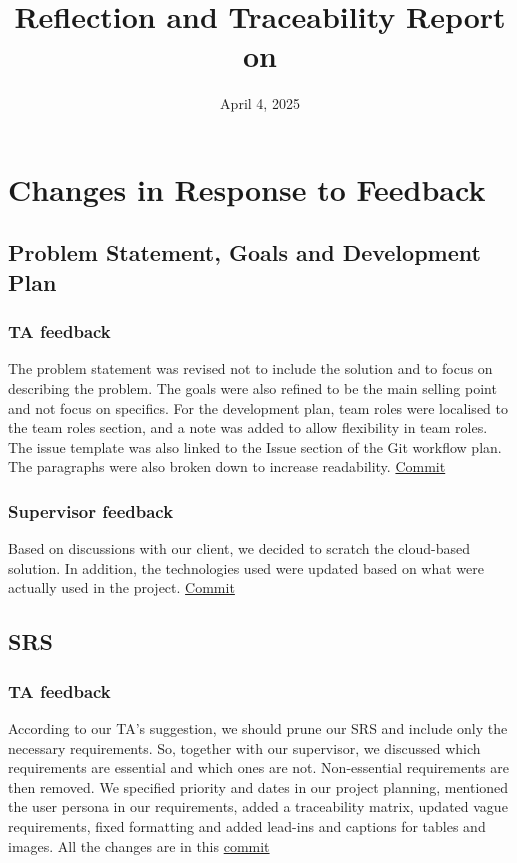 \documentclass{article}
\title{Reflection and Traceability Report on \progname}
\author{\authname}
\date{April 4, 2025}
\begin{document}
\maketitle

\section{Changes in Response to Feedback}

\subsection{Problem Statement, Goals and Development Plan}
\subsubsection{TA feedback}
The problem statement was revised not to include the solution and to focus on describing the problem. The goals were also refined to be the main selling point and not focus on specifics. For the development plan, team roles were localised to the team roles section, and a note was added to allow flexibility in team roles. The issue template was also linked to the Issue section of the Git workflow plan. The paragraphs were also broken down to increase readability. \href{https://github.com/AidanMariglia/SOCAlgoTestPlatform/pull/168}{Commit}

\subsubsection{Supervisor feedback}
Based on discussions with our client, we decided to scratch the cloud-based solution. In addition, the technologies used were updated based on what were actually used in the project. \href{https://github.com/AidanMariglia/SOCAlgoTestPlatform/pull/168}{Commit}


\subsection{SRS}
\subsubsection{TA feedback}
According to our TA's suggestion, we should prune our SRS and include only the necessary requirements. So, together with our supervisor, we discussed which requirements are essential and which ones are not. Non-essential requirements are then removed. We specified priority and dates in our project planning, mentioned the user persona in our requirements, added a traceability matrix, updated vague requirements, fixed formatting and added lead-ins and captions for tables and images. All the changes are in this \href{https://github.com/AidanMariglia/SOCAlgoTestPlatform/pull/174}{commit}
\end{document}
